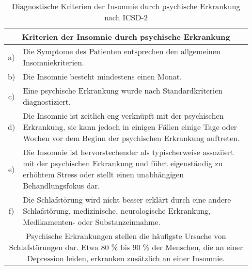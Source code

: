 \newpage


\begin{table}[H] 
\centering
\begin{tabularx}{\textwidth}{cX}
\toprule
\multicolumn{2}{c}{\textbf{Kriterien der Insomnie durch psychische Erkrankung}}\\
\midrule 
a) & Die Symptome des Patienten entsprechen den allgemeinen Insomniekriterien.\\
b) & Die Insomnie besteht mindestens einen Monat.\\
c) & Eine psychische Erkrankung wurde nach Standardkriterien diagnostiziert.\\
d) & Die Insomnie ist zeitlich eng verknüpft mit der psychischen Erkrankung, sie kann jedoch in einigen Fällen einige Tage oder Wochen vor dem Beginn der psychischen Erkrankung auftreten.\\
e) & Die Insomnie ist hervorstechender als typischerweise assoziiert mit der psychischen Erkrankung und führt eigenständig zu erhöhtem Stress oder stellt einen unabhängigen Behandlungsfokus dar.\\
f) & Die Schlafstörung wird nicht besser erklärt durch eine andere Schlafstörung, medizinische, neurologische Erkrankung, Medikamenten- oder Substanzeinnahme.\\
\midrule
\multicolumn{2}{p{0.97\textwidth}}{Psychische Erkrankungen stellen die häufigste Ursache von Schlafstörungen dar. Etwa 80 \% bis 90 \% der Menschen, die an einer Depression leiden, erkranken zusätzlich an einer Insomnie.}\\
\bottomrule
\end{tabularx}
\caption[Kriterien der Insomnie durch psychische Erkrankung]{Diagnostische Kriterien der Insomnie durch psychische Erkrankung nach \acs{ICSD-2} \parencite{mayer_s3-leitlinie_2009, happe_schlafmedizin_2009}}
\label{tab:insomnie_psychisch}
\end{table}




